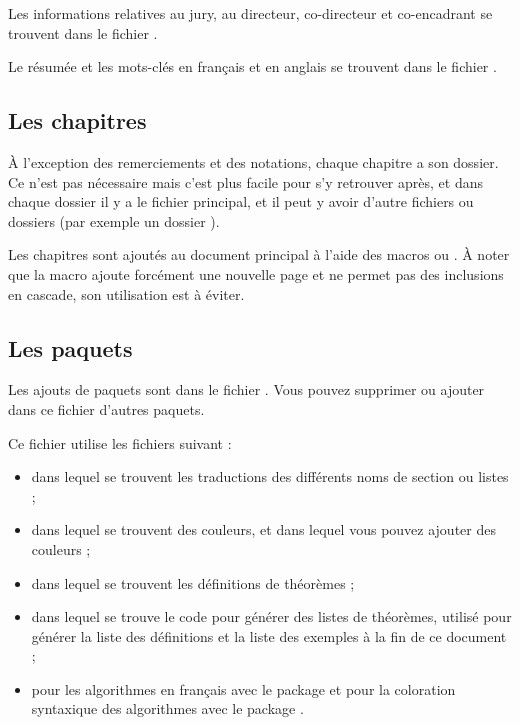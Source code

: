   Les informations relatives au jury, au directeur, co-directeur et co-encadrant se trouvent dans le fichier .
  
  Le résumée et les mots-clés en français et en anglais se trouvent dans le fichier .
  
  \subsection{Les chapitres}
  À l'exception des remerciements et des notations, chaque chapitre a son dossier. 
  Ce n'est pas nécessaire mais c'est plus facile pour s'y retrouver après, et dans chaque dossier il y a le fichier principal, et il peut y avoir d'autre fichiers ou dossiers (par exemple un dossier ).
  
  Les chapitres sont ajoutés au document principal à l'aide des macros \verb|| ou \verb||. À noter que la macro \verb|| ajoute forcément une nouvelle page et ne permet pas des inclusions en cascade, son utilisation est à éviter.
  
  \subsection{Les paquets}
  Les ajouts de paquets sont dans le fichier . Vous pouvez supprimer ou ajouter dans ce fichier d'autres paquets. 
  
  Ce fichier utilise les fichiers suivant :
  \begin{itemize}
    \item {} dans lequel se trouvent les traductions des différents noms de section ou listes ;
    \item {} dans lequel se trouvent des couleurs, et dans lequel vous pouvez ajouter des couleurs ;
    \item {} dans lequel se trouvent les définitions de théorèmes ;
    \item {} dans lequel se trouve le code pour générer des listes de théorèmes, utilisé pour générer la liste des définitions et la liste des exemples à la fin de ce document ;
    \item {} pour les algorithmes en français avec le package  et  pour la coloration syntaxique des algorithmes avec le package .
  \end{itemize}

